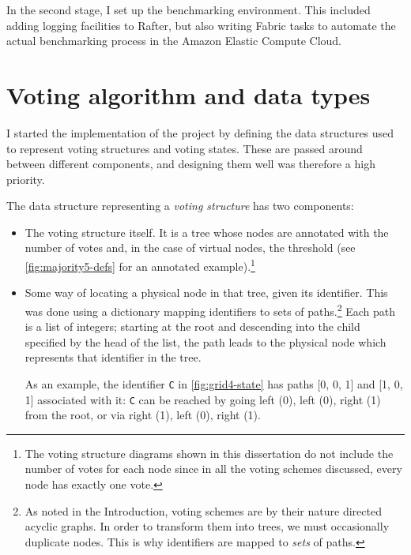 \documentclass[12pt,chapterprefix=true,toc=bibliography,numbers=noendperiod,
               footnotes=multiple,twoside]{scrreprt}
\begin{document}
In the second stage, I set up the benchmarking environment. This included adding logging facilities to Rafter, but also writing Fabric tasks to automate the actual benchmarking process in the Amazon Elastic Compute Cloud.


\section{Voting algorithm and data types}
\label{sc:voting-algo}

I started the implementation of the project by defining the data structures used to represent voting structures and voting states. These are passed around between different components, and designing them well was therefore a high priority.

The data structure representing a \emph{voting structure} has two components:

\begin{itemize}
    \item The voting structure itself. It is a tree whose nodes are annotated with the number of votes and, in the case of virtual nodes, the threshold (see \cref{fig:majority5-defs} for an annotated example).\footnote{The voting structure diagrams shown in this dissertation do not include the number of votes for each node since in all the voting schemes discussed, every node has exactly one vote.}
    \item Some way of locating a physical node in that tree, given its identifier. This was done using a dictionary mapping identifiers to sets of paths.\footnote{As noted in the Introduction, voting schemes are by their nature directed acyclic graphs. In order to transform them into trees, we must occasionally duplicate nodes. This is why identifiers are mapped to \emph{sets} of paths.} Each path is a list of integers; starting at the root and descending into the child specified by the head of the list, the path leads to the physical node which represents that identifier in the tree.

        As an example, the identifier \texttt{C} in \cref{fig:grid4-state} has paths [0, 0, 1] and [1, 0, 1] associated with it: \texttt{C} can be reached by going left (0), left (0), right (1) from the root, or via right (1), left (0), right (1).
\end{itemize}
\end{document}
